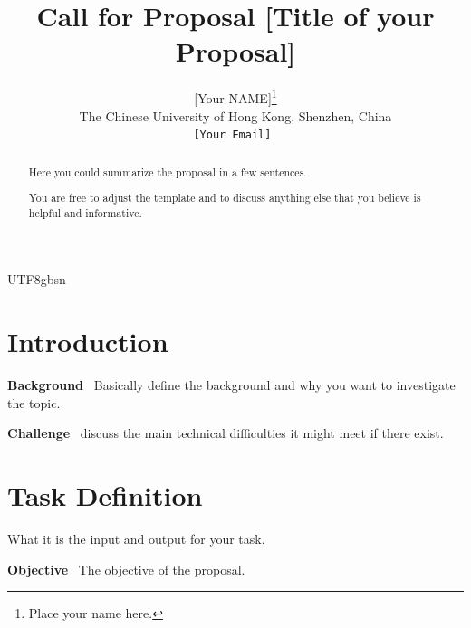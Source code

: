 \documentclass{article}%
\title{Call for Proposal [Title of your Proposal]  }
\author{[Your NAME]\thanks{Place your name here.}\\
The Chinese University of Hong Kong, Shenzhen, China\\
\texttt{[Your Email] }\\
}
\begin{document}
\begin{CJK}{UTF8}{gbsn}

\maketitle


\begin{abstract}

    Here you could summarize the proposal in a few sentences.
    
    { \color{blue} You are free to adjust the template and to discuss anything else that you believe is helpful and informative.}
\end{abstract}

\section{Introduction}

\textbf{Background}~
Basically define the background and why you want to investigate the topic.


\textbf{Challenge}~ discuss the main technical difficulties it might meet if there exist.






\section{Task Definition}


What it is the input and output for your task.


\textbf{Objective}~
The objective of the proposal.









\end{CJK}
\end{document}
